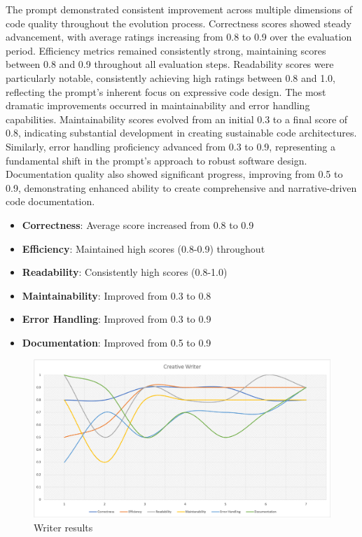 \documentclass[10pt,a4paper,twocolumn]{article}
\begin{document}
\begin{appendices}
The prompt demonstrated consistent improvement across multiple dimensions of code quality throughout the evolution process. Correctness scores showed steady advancement, with average ratings increasing from 0.8 to 0.9 over the evaluation period. Efficiency metrics remained consistently strong, maintaining scores between 0.8 and 0.9 throughout all evaluation steps. Readability scores were particularly notable, consistently achieving high ratings between 0.8 and 1.0, reflecting the prompt's inherent focus on expressive code design.
The most dramatic improvements occurred in maintainability and error handling capabilities. Maintainability scores evolved from an initial 0.3 to a final score of 0.8, indicating substantial development in creating sustainable code architectures. Similarly, error handling proficiency advanced from 0.3 to 0.9, representing a fundamental shift in the prompt's approach to robust software design. Documentation quality also showed significant progress, improving from 0.5 to 0.9, demonstrating enhanced ability to create comprehensive and narrative-driven code documentation.

\begin{itemize}
    \item \textbf{Correctness}: Average score increased from 0.8 to 0.9
    \item \textbf{Efficiency}: Maintained high scores (0.8-0.9) throughout
    \item \textbf{Readability}: Consistently high scores (0.8-1.0)
    \item \textbf{Maintainability}: Improved from 0.3 to 0.8
    \item \textbf{Error Handling}: Improved from 0.3 to 0.9
    \item \textbf{Documentation}: Improved from 0.5 to 0.9
\end{itemize}


\begin{figure}
    \centering
    \includegraphics[width=0.9\linewidth]{writer_results.png}
    \caption{Writer results}
    \label{fig:writer}
\end{figure}



\end{appendices}
\end{document}

